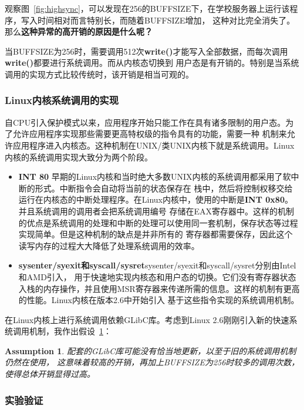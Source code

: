 \documentclass[a4paper,twoside]{article}
\newtheorem{assumption}{Assumption}[section]
\begin{document}
\begin{spacing}{1.2}
观察图~\ref{fig:highsync}，可以发现在256的BUFFSIZE下，在学校服务器上运行该程序，写入时间相对而言特别长，而随着BUFFSIZE增加，
这种对比完全消失了。那么\textbf{这种异常的高开销的原因是什么呢？}

当BUFFSIZE为256时，需要调用512次\textbf{write()}才能写入全部数据，而每次调用\textbf{write()}都要进行系统调用。而从内核态切换到
用户态是有开销的。特别是当系统调用的实现方式比较传统时，该开销是相当可观的。

\subsubsection{Linux内核系统调用的实现}

自CPU引入保护模式以来，应用程序开始只能工作在具有诸多限制的用户态。为了允许应用程序实现那些需要更高特权级的指令具有的功能，需要一种
机制来允许应用程序进入内核态。这种机制在UNIX/类UNIX内核下就是系统调用。Linux内核的系统调用实现大致分为两个阶段。

\begin{itemize}
	\item \textbf{INT 80} 早期的Linux内核和当时绝大多数UNIX内核的系统调用都采用了软中断的形式。中断指令会自动将当前的状态保存在
	栈中，然后将控制权移交给运行在内核态的中断处理程序。在Linux内核中，使用的中断是\textbf{INT 0x80}。并且系统调用的调用者会把系统调用编号
	存储在EAX寄存器中。这样的机制的优点是系统调用的处理和中断的处理可以使用同一套机制，保存状态等过程实现简单。但是这种机制的缺点是并非所有的
	寄存器都需要保存，因此这个读写内存的过程大大降低了处理系统调用的效率。

	\item \textbf{sysenter/syexit和syscall/sysret}sysenter/syexit和syscall/sysret分别由Intel\cite{guide2011intel}和AMD\cite{amd2018amd64}引入，
	用于快速地实现内核态和用户态的切换。它们没有寄存器状态入栈的内存操作，并且使用MSR寄存器来传递所需的信息。这样的机制有更高的性能。Linux内核在版本2.6中开始引入
	基于这些指令实现的系统调用机制。
\end{itemize}

在Linux内核上进行系统调用依赖GLibC库。考虑到Linux 2.6刚刚引入新的快速系统调用机制，我作出假设~\ref{ass:syscall}：

\begin{assumption}
	\label{ass:syscall}
	配套的GLibC库可能没有恰当地更新，以至于旧的系统调用机制仍然在使用，
	这意味着较高的开销，再加上BUFFSIZE为256时较多的调用次数，使得总体开销显得过高。
\end{assumption}

\subsubsection{实验验证}


\end{spacing}
\end{document}
